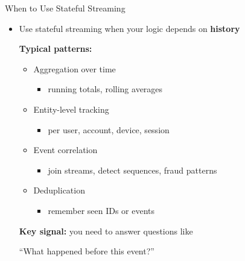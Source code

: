 \documentclass[aspectratio=169]{beamer}
\begin{document}
\begin{frame}{When to Use Stateful Streaming}
\begin{itemize}
    \item Use stateful streaming when your logic depends on \textbf{history}
    
    \vspace{0.2cm}
    \textbf{Typical patterns:}
    \begin{itemize}
        \item Aggregation over time
        \begin{itemize}
            \item running totals, rolling averages
        \end{itemize}
        \item Entity-level tracking
        \begin{itemize}
            \item per user, account, device, session
        \end{itemize}
        \item Event correlation
        \begin{itemize}
            \item join streams, detect sequences, fraud patterns
        \end{itemize}
        \item Deduplication
        \begin{itemize}
            \item remember seen IDs or events
        \end{itemize}
    \end{itemize}

    \vspace{0.3cm}
    \textbf{Key signal:} you need to answer questions like
    \begin{block}{}
    ``What happened before this event?''
    \end{block}
\end{itemize}
\end{frame}
\end{document}
